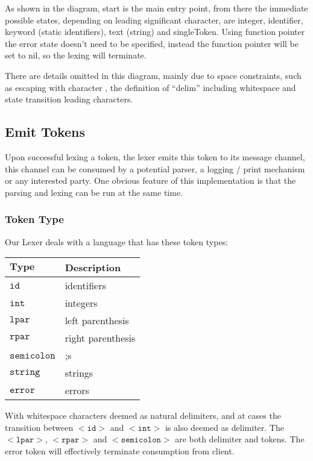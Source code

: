 \documentclass[%
 aip,
 jmp,%
 amsmath,amssymb,
 reprint,%
]{revtex4-1}
\begin{document}
As shown in the diagram, {start}
is the main entry point, from there the immediate possible states, depending
on leading significant character, are {integer}, {identifier}, {keyword}
(static identifiers), {text} (string) and {singleToken}. Using function pointer
the {error} state doesn't need to be specified, instead the function pointer
will be set to nil, so the lexing will terminate.

There are details omitted in this diagram, mainly due to space constraints, such
as escaping with character {\large \texttildelow}, the definition of ``delim'' including
whitespace and state transition leading characters.

\subsection{Emit Tokens}

Upon successful lexing a token, the lexer emits this token to its message
channel, this channel can be consumed by a potential parser, a logging / print
mechanism or any interested party. One obvious feature of this implementation
is that the parsing and lexing can be run at the same time.

\subsubsection{Token Type}
Our Lexer deals with a language that has these token types:

\begin{table}[h]
\centering
\begin{tabular}{l|l}
$\mathbf{Type}$& Description \\
\hline
$\mathtt{id}$& identifiers \\
$\mathtt{int}$& integers \\
$\mathtt{lpar}$& left parenthesis \\
$\mathtt{rpar}$& right parenthesis \\
$\mathtt{semicolon}$& ;s \\
$\mathtt{string}$& strings \\
$\mathtt{error}$& errors
\end{tabular}
\end{table}

With whitespace characters deemed as natural delimiters, and at cases the
transition between $\mathtt{<id>}$ and $\mathtt{<int>}$ is also deemed as delimiter. The $\mathtt{<lpar>}$,
$\mathtt{<rpar>}$ and $\mathtt{<semicolon>}$ are both delimiter and tokens.
The error token will effectively terminate consumption from client.
\end{document}
